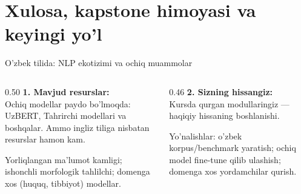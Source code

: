 \documentclass[aspectratio=169,11pt]{beamer}
\begin{document}
\section[Xulosa]{Xulosa, kapstone himoyasi va keyingi yo'l}

\begin{frame}{O'zbek tilida: NLP ekotizimi va ochiq muammolar}
  \begin{columns}[T]
    \begin{column}{0.50\textwidth}
      \textbf{1. Mavjud resurslar:}\\[3pt]
      \small
      Ochiq modellar paydo bo'lmoqda: UzBERT, Tahrirchi modellari va boshqalar.
      Ammo ingliz tiliga nisbatan resurslar hamon kam.
      \begin{tcolorbox}[warnbox,title=Ochiq muammolar,top=2pt,bottom=2pt]
        \footnotesize
        Yorliqlangan ma'lumot kamligi; ishonchli morfologik tahlilchi;
        domenga xos (huquq, tibbiyot) modellar.
      \end{tcolorbox}
    \end{column}
    \begin{column}{0.46\textwidth}
      \textbf{2. Sizning hissangiz:}\\[3pt]
      \small
      Kursda qurgan modullaringiz --- haqiqiy hissaning boshlanishi.
      \begin{tcolorbox}[okbox,top=2pt,bottom=2pt]
        \footnotesize
        Yo'nalishlar: o'zbek korpus/benchmark yaratish; ochiq model fine-tune
        qilib ulashish; domenga xos yordamchilar qurish.
      \end{tcolorbox}
    \end{column}
  \end{columns}
\end{frame}
\end{document}
